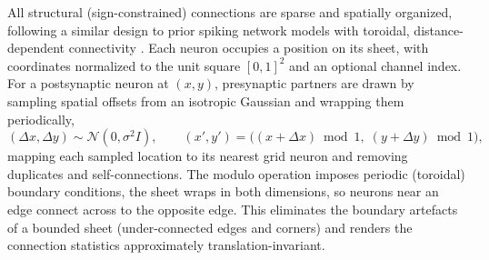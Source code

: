 All structural (sign-constrained) connections are sparse and spatially
organized, following a similar design to prior spiking network models with
toroidal, distance-dependent connectivity \citep{Spreizer2019Toroidal}.
Each neuron occupies a position on its sheet, with coordinates normalized
to the unit square $[0, 1]^2$ and an optional channel index.
For a
postsynaptic neuron at $(x,y)$, presynaptic partners are drawn by sampling
spatial offsets from an isotropic Gaussian and wrapping them periodically,
%
\begin{equation}
(\Delta x, \Delta y) \sim \mathcal{N}\!\left(0, \sigma^2 I\right),
\qquad
(x', y') = \big( (x + \Delta x)\bmod 1,\; (y + \Delta y)\bmod 1 \big),
\label{eq:toroidal-sampling}
\end{equation}
%
mapping each sampled location to its nearest grid neuron and removing
duplicates and self-connections. The modulo operation imposes
periodic (toroidal) boundary conditions, the sheet wraps in both
dimensions, so neurons near an edge connect across to the opposite edge. This
eliminates the boundary artefacts of a bounded sheet (under-connected edges
and corners) and renders the connection statistics approximately
translation-invariant.

